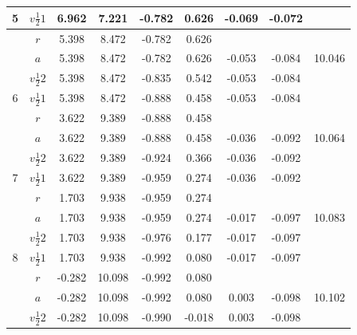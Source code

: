 \begin{table}[h]
\begin{tabular}{|c|c|c|c|c|c|c|c|c|}
5 & $v\frac{1}{2}1$  &	 6.962 &	7.221 &	-0.782 &	0.626 &	-0.069 & -0.072	&        \\ \hline
  & $r$	             &   5.398 &	8.472	& -0.782 &	0.626	&		     &        &        \\ \hline
  & $a$	             &   5.398 &	8.472	& -0.782 & 	0.626	& -0.053 & -0.084 &	10.046 \\ \hline
  & $v\frac{1}{2}2$  &	 5.398 &	8.472	& -0.835 &	0.542	& -0.053 & -0.084	&        \\ \hline
6 & $v\frac{1}{2}1$	 &   5.398 &	8.472	& -0.888 &	0.458	& -0.053 & -0.084	&        \\ \hline
  & $r$	             &   3.622 &	9.389	& -0.888 &	0.458	&		     &        &        \\ \hline
  & $a$	             &   3.622 &	9.389	& -0.888 &	0.458	& -0.036 & -0.092	& 10.064 \\ \hline
  & $v\frac{1}{2}2$  &	 3.622 & 	9.389	& -0.924 &	0.366	& -0.036 & -0.092	&        \\ \hline
7 & $v\frac{1}{2}1$  &	 3.622 &	9.389	& -0.959 &	0.274	& -0.036 & -0.092	&        \\ \hline
  & $r$	             &   1.703 &	9.938	& -0.959 &	0.274	& 		   &        &        \\ \hline
  & $a$	             &   1.703 &	9.938	& -0.959 &	0.274	& -0.017 & -0.097 &	10.083 \\ \hline
  & $v\frac{1}{2}2$  &	 1.703 &	9.938	& -0.976 &	0.177	& -0.017 & -0.097	&        \\ \hline
8 & $v\frac{1}{2}1$  &	 1.703 &	9.938	& -0.992 &	0.080	& -0.017 & -0.097	&        \\ \hline
  & $r$	             &  -0.282 & 10.098	& -0.992 &	0.080	&		     &        &        \\ \hline
  &	$a$              &  -0.282 & 10.098	& -0.992 &	0.080	&  0.003 & -0.098 &	10.102 \\ \hline
  & $v\frac{1}{2}2$  &	-0.282 & 10.098	& -0.990 & -0.018	&  0.003 & -0.098	&        \\ \hline
\end{tabular}
\vspace{-40pt}
\end{table}